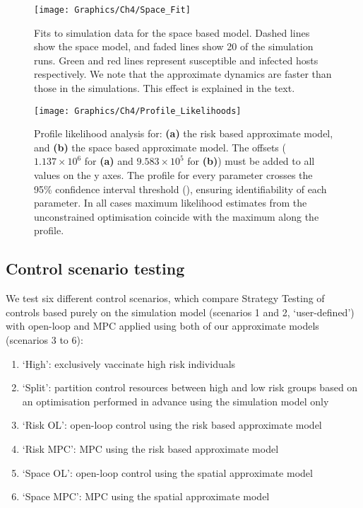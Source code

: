 \begin{figure}[h]
    \begin{center}
        \texttt{[image: Graphics/Ch4/Space\_Fit]}
        \caption{Fits to simulation data for the space based model. Dashed lines show the space model, and faded lines show 20 of the simulation runs. Green and red lines represent susceptible and infected hosts respectively. We note that the approximate dynamics are faster than those in the simulations. This effect is explained in the text. }
        \label{fig:space_fit}
    \end{center}
\end{figure}

\begin{figure}[h]
    \begin{center}
        \texttt{[image: Graphics/Ch4/Profile\_Likelihoods]}
        \caption{Profile likelihood analysis for: \textbf{(a)} the risk based approximate model, and \textbf{(b)} the space based approximate model. The offsets ($1.137\times10^6$ for \textbf{(a)} and $9.583\times10^5$ for \textbf{(b)}) must be added to all values on the y axes. The profile for every parameter crosses the 95\% confidence interval threshold (), ensuring identifiability of each parameter. In all cases maximum likelihood estimates from the unconstrained optimisation coincide with the maximum along the profile.}
        \label{fig:profile_lik}
    \end{center}
\end{figure}

\FloatBarrier
\subsection{Control scenario testing}

We test six different control scenarios, which compare Strategy Testing of controls based purely on the simulation model (scenarios 1 and 2, `user-defined') with open-loop and MPC applied using both of our approximate models (scenarios 3 to 6):
\begin{enumerate}
    \setlength{\itemsep}{3pt}%
    \setlength{\parskip}{3pt}%
    \setlength{\parsep}{3pt}%
    \item{}`High': exclusively vaccinate high risk individuals
    \item{}`Split': partition control resources between high and low risk groups based on an optimisation performed in advance using the simulation model only
    \item{}`Risk OL': open-loop control using the risk based approximate model
    \item{}`Risk MPC': MPC using the risk based approximate model
    \item{}`Space OL': open-loop control using the spatial approximate model
    \item{}`Space MPC': MPC using the spatial approximate model
\end{enumerate}


